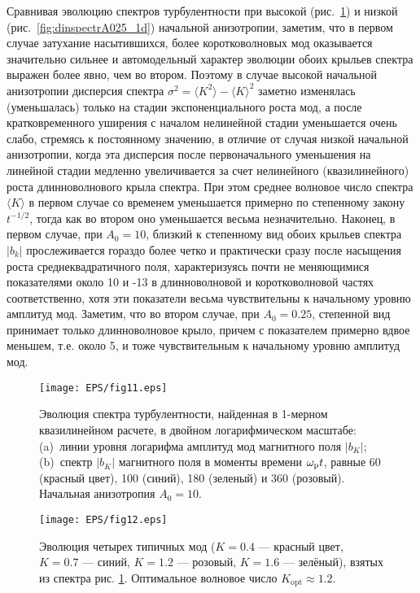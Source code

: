 Сравнивая эволюцию спектров турбулентности при высокой (рис.~\ref{fig:dinspectrA10_1d}) и низкой (рис.~\ref{fig:dinspectrA025_1d}) начальной анизотропии, заметим, что в первом случае затухание насытившихся, более коротковолновых мод оказывается значительно сильнее и автомодельный характер эволюции обоих крыльев спектра выражен более явно, чем во втором. Поэтому в случае высокой начальной анизотропии дисперсия спектра $\sigma^2=\langle K^2\rangle-\langle K\rangle^2$ заметно изменялась (уменьшалась) только на стадии экспоненциального роста мод, а после кратковременного уширения с началом нелинейной стадии уменьшается очень слабо, стремясь к постоянному значению, в отличие от случая низкой начальной анизотропии, когда эта дисперсия после первоначального уменьшения на линейной стадии медленно увеличивается за счет нелинейного (квазилинейного) роста длинноволнового крыла спектра. При этом среднее волновое число спектра $\langle K\rangle$ в первом случае со временем уменьшается примерно по степенному закону $t^{-1/2}$, тогда как во втором оно уменьшается весьма незначительно. Наконец, в первом случае, при $A_0=10$, близкий к степенному вид обоих крыльев спектра $|b_{k}|$ прослеживается гораздо более четко и практически сразу после насыщения роста среднеквадратичного поля, характеризуясь почти не меняющимися показателями около 10 и -13 в длинноволновой и коротковолновой частях соответственно, хотя эти показатели весьма чувствительны к начальному уровню амплитуд мод. Заметим, что во втором случае, при $A_0=0.25$, степенной вид принимает только длинноволновое крыло, причем с показателем примерно вдвое меньшем, т.е. около 5, и тоже чувствительным к начальному уровню амплитуд мод.
\begin{figure}[t]
\centering
\texttt{[image: EPS/fig11.eps]}
\caption{Эволюция спектра турбулентности, найденная в 1-мерном квазилинейном расчете, в двойном логарифмическом масштабе: (a)~линии уровня логарифма амплитуд мод магнитного поля $|b_K|$; (b)~спектр $|b_K|$ магнитного поля в моменты времени $\omega_\mathrm{p} t$, равные 60 (красный цвет), 100 (синий), 180 (зеленый) и 360 (розовый). Начальная анизотропия $A_0=10$.}
\label{fig:dinspectrA10_1d}
\end{figure}

\begin{figure}[b]
\centering
\texttt{[image: EPS/fig12.eps]}
\caption{Эволюция четырех типичных мод ($K=0.4$ --- красный цвет, $K=0.7$ --- синий, $K=1.2$ --- розовый, $K=1.6$ --- зелёный), взятых из спектра рис. \ref{fig:dinspectrA10_1d}. Оптимальное волновое число $K_\mathrm{opt}\approx1.2$.}
\label{fig:evol_garmA010_1d}
\end{figure}

